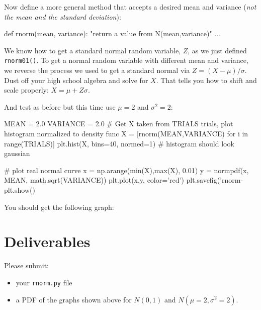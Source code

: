\begin{fullwidth}
\step Now define a more general method that accepts a desired mean and variance ({\em not the mean and the standard deviation}):

\begin{pyverbatim}
def rnorm(mean, variance):
    "return a value from N(mean,variance)"
    ...
\end{pyverbatim}

\noindent We know how to get a standard normal random variable, $Z$, as we just defined {\tt rnorm01()}. To get a normal random variable with different mean and variance, we reverse the process we used to get a standard normal via $Z = (X-\mu)/\sigma$. Dust off your high school algebra and solve for $X$. That tells you how to shift and scale properly: $X = \mu+ Z\sigma$.

\step And test as before but this time use $\mu=2$ and $\sigma^2 = 2$:

\begin{pyverbatim}
MEAN = 2.0
VARIANCE = 2.0
# Get X taken from TRIALS trials, plot histogram normalized to density func
X = [rnorm(MEAN,VARIANCE) for i in range(TRIALS)]
plt.hist(X, bins=40, normed=1) # histogram should look gaussian

# plot real normal curve
x = np.arange(min(X),max(X), 0.01)
y = normpdf(x, MEAN, math.sqrt(VARIANCE))
plt.plot(x,y, color='red') 
plt.savefig('rnorm-%
plt.show()
\end{pyverbatim}

\noindent You should get the following graph:


\section{Deliverables}

Please submit:

\begin{itemize}
\item your {\tt rnorm.py} file
\item a PDF of the graphs shown above for $N(0,1)$ and $N(\mu=2,\sigma^2=2)$.
\end{itemize}

\end{fullwidth}

